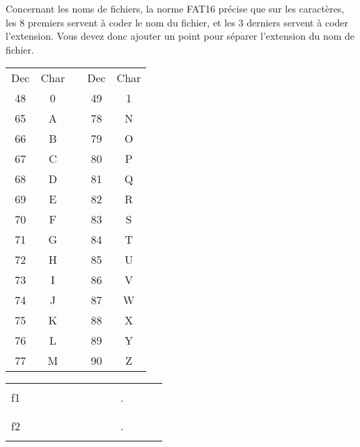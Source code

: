 \documentclass[11pt,a4paper]{article}
\begin{document}
\medskip

Concernant les noms de fichiers, la norme FAT16 précise que sur les caractères, les 8 premiers servent à coder le nom du fichier, et les 3 derniers servent à coder l'extension.
Vous devez donc ajouter un point pour séparer l'extension du nom de fichier.

\medskip

\begin{table}[ht!]
  \centering
  \begin{minipage}{0.3\textwidth}
    \centering

\begin{tabular}{ |c|c| m{0.3cm} |c|c| }
\cline{1-2} \cline{4-5}
Dec & Char &   & Dec & Char \\
\cline{1-2} \cline{4-5}
48 & 0 &  & 49 & 1 \\
\cline{1-2} \cline{4-5}
65 & A &  & 78 & N \\
66 & B &  & 79 & O \\
67 & C &  & 80 & P \\
68 & D &  & 81 & Q \\
69 & E &  & 82 & R \\
70 & F &  & 83 & S \\
71 & G &  & 84 & T \\
72 & H &  & 85 & U \\
73 & I &  & 86 & V \\
74 & J &  & 87 & W \\
75 & K &  & 88 & X \\
76 & L &  & 89 & Y \\
77 & M &  & 90 & Z \\
\cline{1-2} \cline{4-5}
\end{tabular}

  \end{minipage}
  \hfillx
  \begin{minipage}{0.65\textwidth}
    \centering

\begin{tabular}{ c   | m{0.45cm} | m{0.45cm} | m{0.45cm} | m{0.45cm} | m{0.45cm} | m{0.45cm} | m{0.45cm} | m{0.45cm} | c | m{0.45cm} | m{0.45cm} | m{0.45cm} | }
\cline{2-9} \cline{11-13}
 & & & & & & & & &   & & & \\
f1   & & & & & & & & &  .  & & & \\
 & & & & & & & & &   & & & \\
\cline{2-9} \cline{11-13}
 & & & & & & & & &   & & & \\
f2   & & & & & & & & &  .  & & & \\
 & & & & & & & & &   & & & \\
\cline{2-9} \cline{11-13}
\end{tabular}

  \end{minipage}
\end{table}
\end{document}
